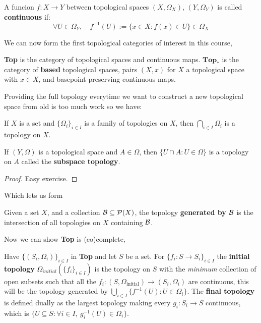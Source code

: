\documentclass[a4paper]{article}
\begin{document}
\begin{definition}
    A funcion $f:X\rightarrow Y$ between topological spaces $(X,\Omega_X)$, $(Y,\Omega_Y)$ is called \textbf{continuous} if: \[
    \forall U \in \Omega_Y, \quad f^{-1}(U) :=\{x\in X: f(x)\in U\} \in \Omega_X
    \]
\end{definition}
We can now form the first topological categories of interest in this course,
\begin{definition}
    \textbf{Top} is the category of topological spaces and continuous maps. $\textbf{Top}_*$ is the category of \textbf{based} topological spaces, pairs $(X,x)$ for $X$ a topological space with $x\in X$, and basepoint-preserving continuous maps.
\end{definition}
Providing the full topology everytime we want to construct a new topological space from old is too much work so we have:
\begin{proposition}
    If $X$ is a set and $\{\Omega_i\}_{i\in I}$ is a family of topologies on $X$, then $\bigcap_{i\in I}\Omega_i$ is a topology on $X$.
    
    If $(Y,\Omega)$ is a topological space and $A\in \Omega$, then $\{U\cap A: U\in\Omega\}$ is a topology on $A$ called the \textbf{subspace topology}.
    \begin{proof}
        Easy exercise.
    \end{proof}
\end{proposition}
Which lets us form
\begin{definition}
    Given a set $X$, and a collection $\mathcal{B}\subseteq\mathcal{P}(X)$, the topology \textbf{generated by} $\mathcal{B}$ is the intersection of all topologies on $X$ containing $\mathcal{B}$.
\end{definition}
Now we can show \textbf{Top} is (co)complete,
\begin{definition}
    Have $\{(S_i,\Omega_i)\}_{i\in I}$ in \textbf{Top} and let $S$ be a set. For $\{f_i: S\rightarrow S_i\}_{i\in I}$ the \textbf{initial topology} $\Omega_{initial}(\{f_i\}_{i\in I})$ is the topology on $S$ with the \textit{minimum} collection of open subsets such that all the $f_i:(S,\Omega_{\text{initial}})\rightarrow (S_i,\Omega_i)$ are continuous, this will be the topology generated by $\bigcup_{i\in I}\{f^{-1}(U):  U\in\Omega_i\}$.
    The \textbf{final topology} is defined dually as the largest topology making every $g_i:S_i\rightarrow S$ continuous, which is $\{U\subseteq S: \forall i\in I, \ g_i^{-1}(U) \in \Omega_i\}$.
\end{definition}
\end{document}
